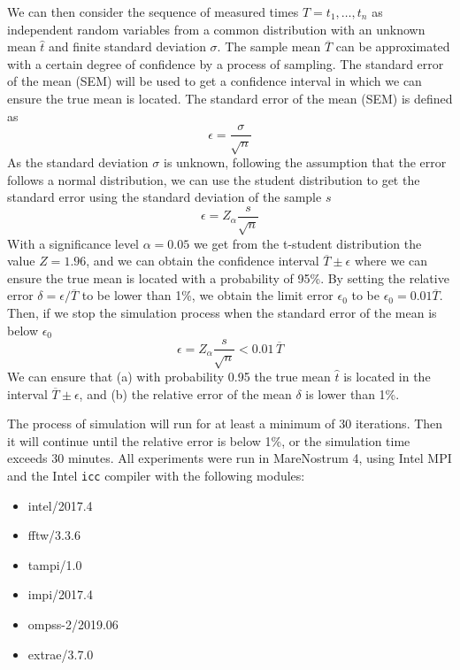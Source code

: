 We can then consider the sequence of measured times $T = t_1,\ldots,t_n$ as 
independent random variables from a common distribution with an unknown mean 
$\hat t$ and finite standard deviation $\sigma$. The sample mean $\overline T$ 
can be approximated with a certain degree of confidence by a process of 
sampling. The standard error of the mean (SEM) will be used to get a confidence 
interval in which we can ensure the true mean is located. The standard error of 
the mean (SEM) is defined as
%
\begin{equation}
\epsilon = \frac{\sigma}{\sqrt{n}}
\end{equation}
%
As the standard deviation $\sigma$ is unknown, following the assumption that the 
error follows a normal distribution, we can use the student distribution to get 
the standard error using the standard deviation of the sample $s$
%
\begin{equation}
\epsilon = Z_\alpha\frac{s}{\sqrt{n}}
\end{equation}
%
With a significance level $\alpha=0.05$ we get from the t-student distribution 
the value $Z=1.96$, and we can obtain the confidence interval $\overline T \pm 
\epsilon$ where we can ensure the true mean is located with a probability of 
95\%. By setting the relative error $\delta = \epsilon / \overline T$ to be 
lower than 1\%, we obtain the limit error $\epsilon_0$ to be $\epsilon_0 = 0.01 
\overline T$.
%
Then, if we stop the simulation process when the standard error of the mean is 
below $\epsilon_0$
%
\begin{equation}
\epsilon = Z_\alpha\frac{s}{\sqrt{n}} < 0.01 \, \overline T
\end{equation}
%
We can ensure that (a) with probability 0.95 the true mean $\hat t$ is located 
in the interval $\overline T \pm \epsilon$, and (b) the relative error of the 
mean $\delta$ is lower than 1\%.

The process of simulation will run for at least a minimum of 30 iterations. Then 
it will continue until the relative error is below 1\%, or the simulation time 
exceeds 30 minutes.
%
All experiments were run in MareNostrum 4, using Intel MPI and the Intel 
\texttt{icc} compiler with the following modules:
\begin{multicols}{3}
\begin{itemize}
\item intel/2017.4
\item fftw/3.3.6
\item tampi/1.0
\item impi/2017.4
\item ompss-2/2019.06
\item extrae/3.7.0
\end{itemize}
\end{multicols}

